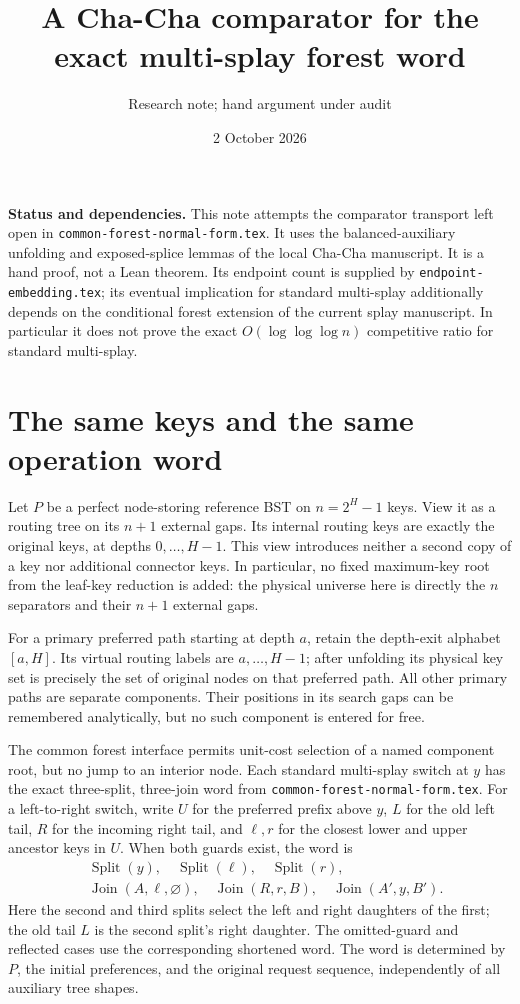 \documentclass[11pt]{article}
\title{A Cha-Cha comparator for the exact multi-splay forest word}
\author{Research note; hand argument under audit}
\date{2 October 2026}
\begin{document}
\maketitle

\noindent\textbf{Status and dependencies.}
This note attempts the comparator transport left open in
\texttt{common-forest-normal-form.tex}. It uses the balanced-auxiliary
unfolding and exposed-splice lemmas of the local Cha-Cha manuscript.
It is a hand proof, not a Lean theorem. Its endpoint count is supplied
by \texttt{endpoint-embedding.tex}; its eventual implication for standard
multi-splay additionally depends on the conditional forest extension
of the current splay manuscript. In particular it does not prove the
exact $O(\log\log\log n)$ competitive ratio for standard multi-splay.

\section{The same keys and the same operation word}

Let $P$ be a perfect node-storing reference BST on $n=2^H-1$ keys.
View it as a routing tree on its $n+1$ external gaps. Its internal
routing keys are exactly the original keys, at depths $0,\ldots,H-1$.
This view introduces neither a second copy of a key nor additional
connector keys. In particular, no fixed maximum-key root from the
leaf-key reduction is added: the physical universe here is directly
the $n$ separators and their $n+1$ external gaps.

For a primary preferred path starting at depth $a$, retain the
depth-exit alphabet $[a,H]$. Its virtual routing labels are
$a,\ldots,H-1$; after unfolding its physical key set is precisely the
set of original nodes on that preferred path. All other primary paths
are separate components. Their positions in its search gaps can be
remembered analytically, but no such component is entered for free.

The common forest interface permits unit-cost selection of a named
component root, but no jump to an interior node. Each standard
multi-splay switch at $y$ has the exact three-split, three-join word
from \texttt{common-forest-normal-form.tex}. For a left-to-right switch,
write $U$ for the preferred prefix above $y$, $L$ for the old left
tail, $R$ for the incoming right tail, and $\ell,r$ for the closest
lower and upper ancestor keys in $U$. When both guards exist, the word is
\begin{align*}
 &\operatorname{Split}(y),\quad
   \operatorname{Split}(\ell),\quad
   \operatorname{Split}(r),\\
 &\operatorname{Join}(A,\ell,\varnothing),\quad
   \operatorname{Join}(R,r,B),\quad
   \operatorname{Join}(A',y,B').                 \tag{1}
\end{align*}
Here the second and third splits select the left and right daughters
of the first; the old tail $L$ is the second split's right daughter.
The omitted-guard and reflected cases use the corresponding shortened
word. The word is determined by $P$, the initial preferences, and the
original request sequence, independently of all auxiliary tree shapes.
\end{document}
